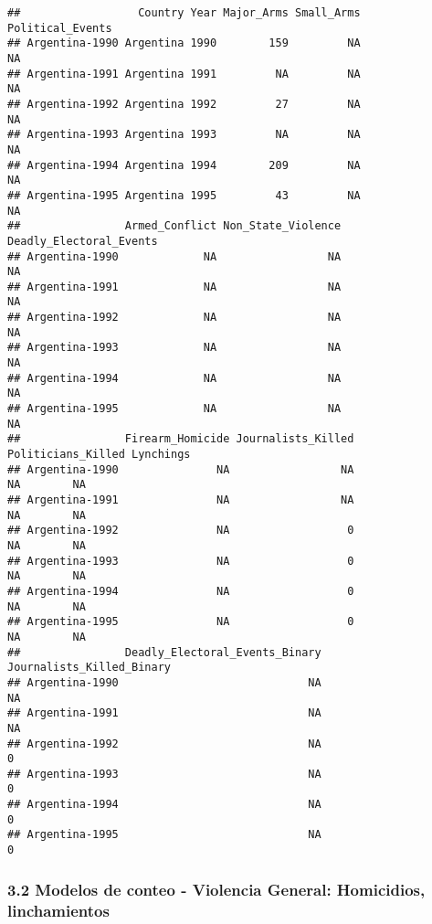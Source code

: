 \documentclass[
  11pt,
]{article}
\begin{document}
\begin{verbatim}
##                  Country Year Major_Arms Small_Arms Political_Events
## Argentina-1990 Argentina 1990        159         NA               NA
## Argentina-1991 Argentina 1991         NA         NA               NA
## Argentina-1992 Argentina 1992         27         NA               NA
## Argentina-1993 Argentina 1993         NA         NA               NA
## Argentina-1994 Argentina 1994        209         NA               NA
## Argentina-1995 Argentina 1995         43         NA               NA
##                Armed_Conflict Non_State_Violence Deadly_Electoral_Events
## Argentina-1990             NA                 NA                      NA
## Argentina-1991             NA                 NA                      NA
## Argentina-1992             NA                 NA                      NA
## Argentina-1993             NA                 NA                      NA
## Argentina-1994             NA                 NA                      NA
## Argentina-1995             NA                 NA                      NA
##                Firearm_Homicide Journalists_Killed Politicians_Killed Lynchings
## Argentina-1990               NA                 NA                 NA        NA
## Argentina-1991               NA                 NA                 NA        NA
## Argentina-1992               NA                  0                 NA        NA
## Argentina-1993               NA                  0                 NA        NA
## Argentina-1994               NA                  0                 NA        NA
## Argentina-1995               NA                  0                 NA        NA
##                Deadly_Electoral_Events_Binary Journalists_Killed_Binary
## Argentina-1990                             NA                        NA
## Argentina-1991                             NA                        NA
## Argentina-1992                             NA                         0
## Argentina-1993                             NA                         0
## Argentina-1994                             NA                         0
## Argentina-1995                             NA                         0
\end{verbatim}

\subsubsection{3.2 Modelos de conteo - Violencia General: Homicidios,
linchamientos}\label{modelos-de-conteo---violencia-general-homicidios-linchamientos}
\end{document}

